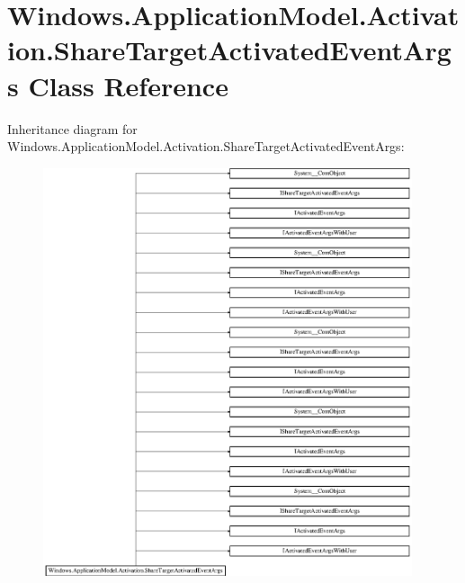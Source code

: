 \hypertarget{class_windows_1_1_application_model_1_1_activation_1_1_share_target_activated_event_args}{}\section{Windows.\+Application\+Model.\+Activation.\+Share\+Target\+Activated\+Event\+Args Class Reference}
\label{class_windows_1_1_application_model_1_1_activation_1_1_share_target_activated_event_args}
Inheritance diagram for Windows.\+Application\+Model.\+Activation.\+Share\+Target\+Activated\+Event\+Args\+:\begin{figure}[H]
\begin{center}
\leavevmode
\includegraphics[height=12.000000cm]{class_windows_1_1_application_model_1_1_activation_1_1_share_target_activated_event_args}
\end{center}
\end{figure}
